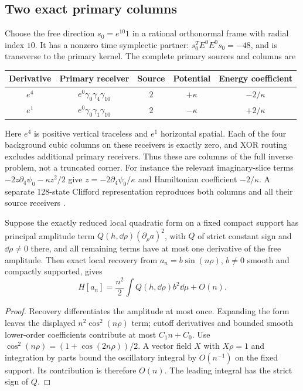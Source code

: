 \subsection{Two exact primary columns}
Choose the free direction $s_0=e^{10}1$ in a rational orthonormal frame
with radial index $10$. It has a nonzero time symplectic partner:
$s_0^TE^0E^0s_0=-48$, and is transverse to the primary kernel.
The complete primary sources and columns are
\begin{center}
\begin{tabular}{ccccc}
\toprule
Derivative & Primary receiver & Source & Potential & Energy coefficient\\
\midrule
$e^4$ & $e^0\gamma_0\gamma_4\gamma_{10}$ & $2$ & $+\kappa$ & $-2/\kappa$\\
$e^1$ & $e^0\gamma_0\gamma_1\gamma_{10}$ & $2$ & $-\kappa$ & $+2/\kappa$\\
\bottomrule
\end{tabular}
\end{center}
Here $e^4$ is positive vertical traceless and $e^1$ horizontal spatial.
Each of the four background cubic columns on these receivers is exactly
zero, and XOR routing excludes additional primary receivers. Thus these
are columns of the full inverse problem, not a truncated corner.
For instance the relevant imaginary-slice terms
$-2z\partial_4\psi_0-\kappa z^2/2$ give
$z=-2\partial_4\psi_0/\kappa$ and Hamiltonian coefficient
$-2/\kappa$. A separate 128-state Clifford representation reproduces
both columns and all their source receivers \cite{ImaginaryEnergy}.

\begin{lemma}
\label{lem:oscillation}
Suppose the exactly reduced local quadratic form on a fixed compact
support has principal amplitude term $Q(h,\dd\rho)(\partial_\rho a)^2$,
with $Q$ of strict constant sign and $\dd\rho\ne0$ there, and all
remaining terms have at most one derivative of the free amplitude.
Then exact local recovery from $a_n=b\sin(n\rho)$, $b\ne0$ smooth and
compactly supported, gives
\begin{equation}
 H[a_n]=\frac{n^2}{2}\int Q(h,\dd\rho)b^2\dd\mu+O(n).
 \label{eq:oscillation}
\end{equation}
\end{lemma}
\begin{proof}
Recovery differentiates the amplitude at most once. Expanding the form
leaves the displayed $n^2\cos^2(n\rho)$ term; cutoff derivatives and
bounded smooth lower-order coefficients contribute at most $C_1n+C_0$.
Use $\cos^2(n\rho)=(1+\cos(2n\rho))/2$.
A vector field $X$ with $X\rho=1$ and integration by parts bound the
oscillatory integral by $O(n^{-1})$ on the fixed support. Its contribution
is therefore $O(n)$. The leading integral has the strict sign of $Q$.
\end{proof}

